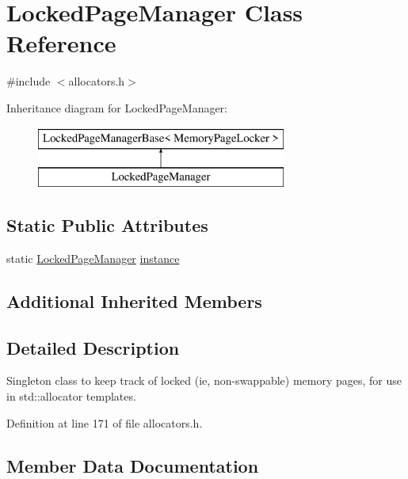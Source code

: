 \hypertarget{class_locked_page_manager}{}\section{Locked\+Page\+Manager Class Reference}
\label{class_locked_page_manager}


{\ttfamily \#include $<$allocators.\+h$>$}

Inheritance diagram for Locked\+Page\+Manager\+:\begin{figure}[H]
\begin{center}
\leavevmode
\includegraphics[height=2.000000cm]{class_locked_page_manager}
\end{center}
\end{figure}
\subsection*{Static Public Attributes}
\begin{DoxyCompactItemize}
\item 
static \hyperlink{class_locked_page_manager}{Locked\+Page\+Manager} \hyperlink{class_locked_page_manager_aedd82df65c12c1d83d43ac8500c57fcf}{instance}
\end{DoxyCompactItemize}
\subsection*{Additional Inherited Members}


\subsection{Detailed Description}
Singleton class to keep track of locked (ie, non-\/swappable) memory pages, for use in std\+::allocator templates. 

Definition at line 171 of file allocators.\+h.



\subsection{Member Data Documentation}
\hypertarget{class_locked_page_manager_aedd82df65c12c1d83d43ac8500c57fcf}{}
